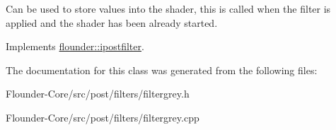 Can be used to store values into the shader, this is called when the filter is applied and the shader has been already started. 



Implements \hyperlink{classflounder_1_1ipostfilter_a9b658b4672718d5ac36539875bde722e}{flounder\+::ipostfilter}.



The documentation for this class was generated from the following files\+:\begin{DoxyCompactItemize}
\item 
Flounder-\/\+Core/src/post/filters/filtergrey.\+h\item 
Flounder-\/\+Core/src/post/filters/filtergrey.\+cpp\end{DoxyCompactItemize}
